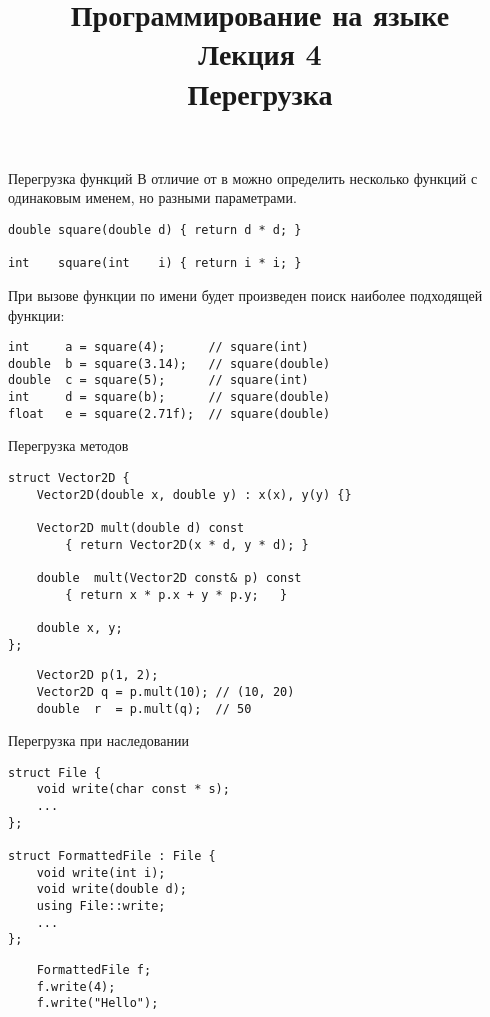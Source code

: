 \documentclass{beamer}
\title{{\bf Программирование на языке \langcpp\protect\\Лекция
4\protect\vspace{1em}\\}Перегрузка}
\begin{document}
\begin{frame} 
  \titlepage
\end{frame}

\begin{frame}[fragile]{Перегрузка функций}
    В отличие от \langc в \langcpp можно определить несколько функций
    с одинаковым именем, но разными параметрами.
    \begin{lstlisting}
double square(double d) { return d * d; }

int    square(int    i) { return i * i; }
    \end{lstlisting}
    При вызове функции по имени будет произведен поиск наиболее подходящей
    функции:
\begin{lstlisting}
int     a = square(4);      // square(int)
double  b = square(3.14);   // square(double)
double  c = square(5);      // square(int)
int     d = square(b);      // square(double)
float   e = square(2.71f);  // square(double)
\end{lstlisting}
\end{frame}

    
\begin{frame}[fragile]{Перегрузка методов}
    \begin{lstlisting}
struct Vector2D {
    Vector2D(double x, double y) : x(x), y(y) {}

    Vector2D mult(double d) const 
        { return Vector2D(x * d, y * d); }
    
    double  mult(Vector2D const& p) const 
        { return x * p.x + y * p.y;   }

    double x, y;
};
\end{lstlisting}

\begin{lstlisting}
    Vector2D p(1, 2);
    Vector2D q = p.mult(10); // (10, 20)
    double  r  = p.mult(q);  // 50 
\end{lstlisting}

\end{frame}

\begin{frame}[fragile]{Перегрузка при наследовании}
    \begin{lstlisting}
struct File {
    void write(char const * s);
    ...
};

struct FormattedFile : File {
    void write(int i);
    void write(double d);
    using File::write;
    ...
};
    \end{lstlisting}

    \begin{lstlisting}
    FormattedFile f;
    f.write(4);
    f.write("Hello");
    \end{lstlisting}

\end{frame}
\end{document}
